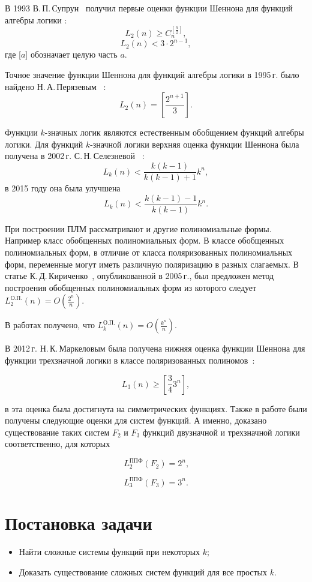 \documentclass [12pt, a4paper] {extarticle}
\begin{document}
В 1993  В.\,П.\,Супрун~\cite{sv93} получил первые оценки функции Шеннона для
функций алгебры логики :
$$
L_2(n) \geqslant C_n^{[\frac{n}{2}]},
$$
$$
L_2(n) < 3 \cdot 2^{n-1},
$$
где [$a$] обозначает целую часть $a$.

Точное значение функции Шеннона для функций алгебры логики в 1995\,г. было
найдено Н.\,А.\,Перязевым~\cite{pn95} :
$$
L_2(n) = \left[\frac{2^{n+1}}{3}\right].
$$

Функции $k$\nobreakdash-значных логик являются естественным обобщением функций
алгебры логики.  Для функций $k$\nobreakdash-значной логики верхняя оценка
функции Шеннона была получена в 2002\,г. С.\,Н.\,Селезневой~\cite{ss02} :
$$
L_k(n) < \frac{k(k-1)}{k(k-1)+1}k^n,
$$
в 2015 году она была улучшена \cite{by15}
$$
L_k(n) < \frac{k(k-1)-1}{k(k-1)}k^n.
$$


При построении ПЛМ рассматривают и другие полиномиальные формы. Например класс
обобщенных полиномиальных форм.  В классе обобщенных полиномиальных форм, в
отличие от класса поляризованных полиномиальных форм, переменные могут иметь
различную поляризацию в разных слагаемых. В статье
К.\,Д.\,Кириченко~\cite{kk05}, опубликованной в 2005\,г., был предложен метод
построения обобщенных полиномиальных форм из которого следует
$L^{\text{О.П.}}_2(n) = O(\frac{2 ^ n}{n})$.

В работах \cite{sd08, bs14} получено, что
$L^{\text{О.П.}}_k(n) = O(\frac{k ^ n}{n})$.

В 2012\,г. Н.\,К.\,Маркеловым была получена нижняя оценка функции Шеннона для
функции трехзначной логики в классе поляризованных полиномов~\cite{mn12}: 

\[ L_3(n) \geqslant \left[\frac{3}{4}3^n\right], \] 

в \cite{ss15} эта оценка была
достигнута на симметрических функциях.  Также в работе \cite{ss15} были
получены следующие оценки для систем функций.  А именно, доказано существование
таких систем $F_2$ и $F_3$ функций двузначной и трехзначной логики
соответственно, для которых

\[ L_2^\text{ППФ}(F_2) = 2^n \text{,} \] 

\[ L_3^\text{ППФ}(F_3) = 3^n \text{.} \]

\newpage
\section{Постановка задачи}
\begin{itemize}
    \item Найти сложные системы функций при некоторых $k$;

    \item Доказать существование сложных систем функций для все простых $k$.
\end{itemize}
    
\end{document}
